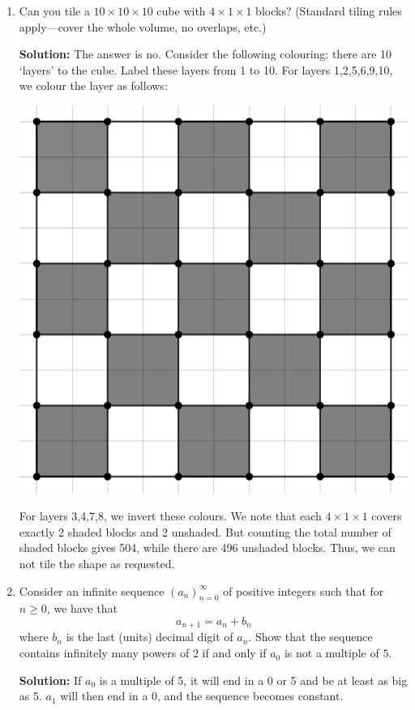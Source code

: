 \documentclass[12pt]{article}
\begin{document}
\begin{enumerate}[itemsep=24pt]
\item %
Can you tile a $10\times 10\times 10$ cube with $4\times 1\times 1$ blocks? (Standard tiling rules apply---cover the whole volume, no overlaps, etc.)

\textbf{Solution:}
The answer is no. Consider the following colouring: there are 10 `layers' to the cube. Label these layers from 1 to 10. For layers 1,2,5,6,9,10, we colour the layer as follows:
\begin{center}
\includegraphics[scale=0.5]{Capture.png}
\end{center}
For layers 3,4,7,8, we invert these colours.
We note that each $4\times 1\times 1$ covers exactly 2 shaded blocks and 2 unshaded.
But counting the total number of shaded blocks gives 504, while there are 496 unshaded blocks.
Thus, we can not tile the shape as requested. 


\item %
Consider an infinite sequence $(a_n)_{n=0}^{\infty}$ of positive integers such that for $n \geq 0$, we have that
\[
    a_{n + 1} = a_n + b_n
\]
where $b_n$ is the last (units) decimal digit of $a_n$. Show that the sequence contains infinitely many powers of $2$ if and only if $a_0$ is not a multiple of $5$.

\textbf{Solution:}
If $a_0$ is a multiple of 5, it will end in a 0 or 5 and be at least as big as 5. $a_1$ will then end in a 0, and the sequence becomes constant.


\end{enumerate}
\end{document}
